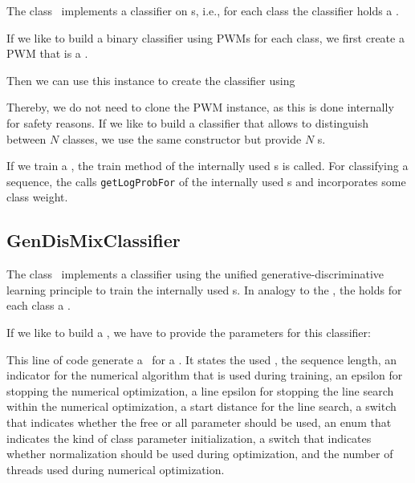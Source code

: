 The class \TrainSMBasedClassifier~implements a classifier on \TrainSM s, i.e., for each class the classifier holds a \TrainSM.
 
If we like to build a binary classifier using PWMs for each class, we first create a PWM that is a \TrainSM.

\addtocounter{off}{-35}

Then we can use this instance to create the classifier using 

\addtocounter{off}{3}

Thereby, we do not need to clone the PWM instance, as this is done internally for safety reasons. If we like to build a classifier that allows to distinguish between $N$ classes, we use the same constructor but provide $N$ \TrainSM s.

If we train a \TrainSMBasedClassifier, the train method of the internally used \TrainSM s is called. For classifying a sequence, the \TrainSMBasedClassifier calls \lstinline+getLogProbFor+ of the internally used \TrainSM s and incorporates some class weight.

\subsection{GenDisMixClassifier}\label{GenDisMixClassifier}

The class \GenDisMixClassifier~implements a classifier using the unified generative-discriminative learning principle to train the internally used \DiffSM s. In analogy to the \TrainSMBasedClassifier, the \GenDisMixClassifier holds for each class a \DiffSM.

If we like to build a \GenDisMixClassifier, we have to provide the parameters for this classifier:

\addtocounter{off}{3}

This line of code generate a \ParameterSet~for a \GenDisMixClassifier. It states 
the used \AlphabetContainer,
the sequence length,
an indicator for the numerical algorithm that is used during training,
an epsilon for stopping the numerical optimization,
a line epsilon for stopping the line search within the numerical optimization,
a start distance for the line search,
a switch that indicates whether the free or all parameter should be used,
an enum that indicates the kind of class parameter initialization,
a switch that indicates whether normalization should be used during optimization,
and the number of threads used during numerical optimization.

